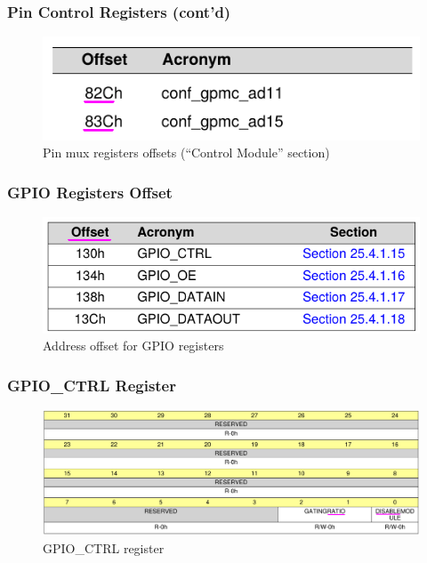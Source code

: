 \documentclass[aspectratio=169,usenames,dvipsnames]{beamer}
\newcounter{cont}
\begin{document}
\begin{frame}
  \frametitle{Pin Control Registers (cont'd)}
    \begin{figure}
      \centering
      \includegraphics[scale=0.5]{images/conf-offsets.png}
      \caption{Pin mux registers offsets (``Control Module'' section)}
  \end{figure}
\end{frame}

\begin{frame}
  \frametitle{GPIO Registers Offset}
    \begin{figure}
      \centering
      \includegraphics[scale=0.5]{images/gpio-registers-offset.png}
      \caption{Address offset for GPIO registers}
  \end{figure}
\end{frame}

\begin{frame}
  \frametitle{GPIO\_CTRL Register}
    \begin{figure}
      \centering
      \includegraphics[scale=0.3]{images/gpio-ctrl.png}
      \caption{GPIO\_CTRL register}
  \end{figure}
\end{frame}
\end{document}
